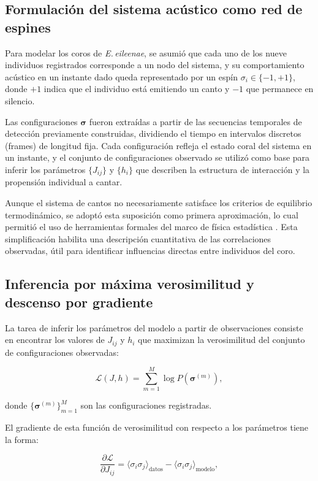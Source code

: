 \subsection{Formulación del sistema acústico como red de espines}

Para modelar los coros de \emph{E.\,eileenae}, se asumió que 
cada uno de los nueve individuos registrados corresponde a un 
nodo del sistema, y su comportamiento acústico en un instante 
dado queda representado por un espín \( \sigma_i \in \{-1, +1\} \), 
donde \( +1 \) indica que el individuo está emitiendo un canto 
y \( -1 \) que permanece en silencio.

Las configuraciones \(\boldsymbol{\sigma}\) fueron extraídas a 
partir de las secuencias temporales de detección previamente 
construidas, 
dividiendo el tiempo en intervalos discretos (frames) de 
longitud fija. Cada configuración refleja el estado coral del 
sistema en un instante, y el conjunto de configuraciones 
observado se utilizó como base para inferir los parámetros 
\( \{J_{ij}\} \) y \( \{h_i\} \) que describen la estructura de 
interacción y la propensión individual a cantar.

Aunque el sistema de cantos no necesariamente satisface los 
criterios de equilibrio termodinámico, se adoptó esta suposición 
como primera aproximación, lo cual permitió el uso de 
herramientas formales del marco de física estadística 
\cite{zeng2013maximum}. Esta simplificación habilita una 
descripción cuantitativa de las correlaciones observadas, útil 
para identificar influencias directas entre individuos del coro.

\subsection{Inferencia por máxima verosimilitud y descenso por 
gradiente}

La tarea de inferir los parámetros del modelo a partir de 
observaciones consiste en encontrar los valores de \( J_{ij} \) 
y \( h_i \) que maximizan la verosimilitud del conjunto de 
configuraciones observadas:

\[
\mathcal{L}(J, h) = \sum_{m=1}^{M} \log P(\boldsymbol{\sigma}^{(m)}),
\]

donde \( \{\boldsymbol{\sigma}^{(m)}\}_{m=1}^M \) son las 
configuraciones registradas.

El gradiente de esta función de verosimilitud con respecto a los 
parámetros tiene la forma:

\[
\frac{\partial \mathcal{L}}{\partial J_{ij}} = \langle \sigma_i \sigma_j \rangle_{\text{datos}} - \langle \sigma_i \sigma_j \rangle_{\text{modelo}},
\]

